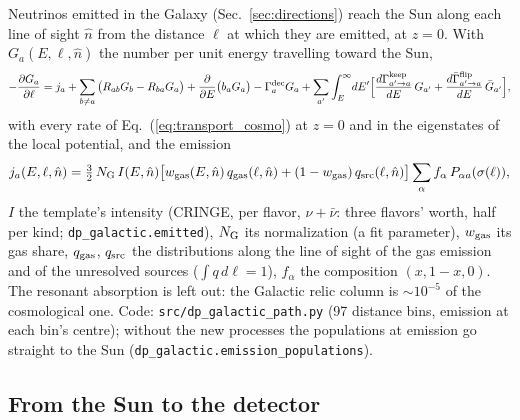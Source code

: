 \documentclass[11pt,a4paper]{article}
\newcommand{\file}[1]{\nolinkurl{#1}}
\begin{document}
Neutrinos emitted in the Galaxy (Sec.~\ref{sec:directions}) reach the Sun along each line of sight $\hat n$ from the
distance $\ell$ at which they are emitted, at $z = 0$. With $G_a(E, \ell, \hat n)$ the number per unit energy travelling
toward the Sun,
\begin{equation}
-\frac{\partial G_a}{\partial\ell} = j_a
+ \sum_{b\ne a}\big(R_{ab}G_b - R_{ba}G_a\big) + \frac{\partial}{\partial E}\big(b_aG_a\big)
- \Gamma^{\rm dec}_aG_a + \sum_{a'}\int_E^\infty\! dE'\Big[\frac{d\Gamma^{\rm keep}_{a'\to a}}{dE}\,G_{a'}
+ \frac{d\bar\Gamma^{\rm flip}_{a'\to a}}{dE}\,\bar G_{a'}\Big],
\label{eq:transport_gal}
\end{equation}
with every rate of Eq.~(\ref{eq:transport_cosmo}) at $z = 0$ and in the eigenstates of the local potential, and the
emission
\begin{equation}
j_a(E, \ell, \hat n) = \tfrac32\,N_{\rm G}\,I(E, \hat n)\big[w_{\rm gas}(E,\hat n)\,q_{\rm gas}(\ell,\hat n)
+ (1 - w_{\rm gas})\,q_{\rm src}(\ell,\hat n)\big]\sum_\alpha f_\alpha\,P_{\alpha a}(\sigma(\ell)),
\end{equation}
$I$ the template's intensity (CRINGE, per flavor, $\nu + \bar\nu$: three flavors' worth, half per kind;
\texttt{dp\_galactic.emitted}), $N_{\rm G}$ its normalization (a fit parameter), $w_{\rm gas}$ its gas
share, $q_{\rm gas}$, $q_{\rm src}$ the distributions along the line of sight of the gas emission and of the unresolved
sources ($\int q\,d\ell = 1$), $f_\alpha$ the composition $(x, 1-x, 0)$. The resonant absorption is left out: the
Galactic relic column is $\sim10^{-5}$ of the cosmological one. Code: \file{src/dp\_galactic\_path.py} (97 distance
bins, emission at each bin's centre); without the new processes the populations at emission go straight to the Sun
(\texttt{dp\_galactic.emission\_populations}).

\subsection{From the Sun to the detector}
\end{document}
